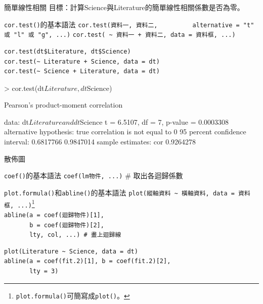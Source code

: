 \documentclass[14pt, aspectratio=43]{beamer}
\let\oldfootnote\footnote
\renewcommand\footnote[1]{\hspace{-0.7em}\oldfootnote{\ignorespaces#1}\hspace{0.5em}}
\begin{document}
\begin{frame}{簡單線性相關}
目標：計算Science與Literature的簡單線性相關係數是否為零。
\begin{block}{\texttt{cor.test()}的基本語法}
\verb+cor.test(資料一, 資料二,+
\verb+         alternative = "t" 或 "l" 或 "g", ...)+
\verb#cor.test( ~ 資料一 + 資料二, data = 資料框, ...)#
\end{block}
\begin{verbatim}
cor.test(dt$Literature, dt$Science)
cor.test(~ Literature + Science, data = dt)
cor.test(~ Science + Literature, data = dt)
\end{verbatim}

\framebreak

\begin{RC}
> cor.test(dt$Literature, dt$Science)
\end{RC}
\begin{R}
	Pearson's product-moment correlation

data:  dt$Literature and dt$Science
t = 6.5107, df = 7, p-value = 0.0003308
alternative hypothesis: true correlation is not equal to 0
95 percent confidence interval:
 0.6817766 0.9847014
sample estimates:
      cor 
0.9264278
\end{R}
\end{frame}

\begin{frame}[fragile]{散佈圖}

\begin{block}{\texttt{coef()}的基本語法}
\verb+coef(lm物件, ...)+  \# 取出各迴歸係數
\end{block}

\begin{block}{\texttt{plot.formula()}和\texttt{abline()}的基本語法}
\verb+plot(縱軸資料 ~ 橫軸資料, data = 資料框, ...)+\oldfootnote{\texttt{plot.formula()}可簡寫成\texttt{plot()}。}\\
\verb+abline(a = coef(迴歸物件)[1],+\\
\verb+       b = coef(迴歸物件)[2],+\\
\verb+       lty, col, ...) # 畫上迴歸線 +
\end{block}

\begin{verbatim}
plot(Literature ~ Science, data = dt)
abline(a = coef(fit.2)[1], b = coef(fit.2)[2],
       lty = 3)
\end{verbatim}
\end{frame}
\end{document}
